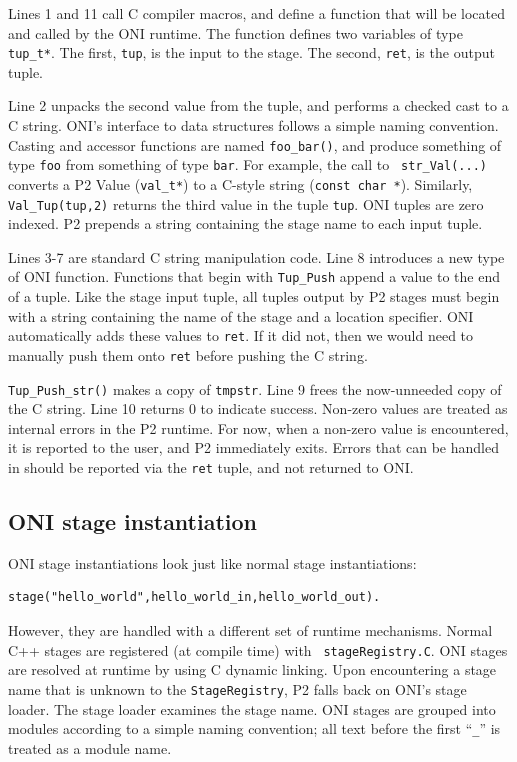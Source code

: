 \documentclass{article}
\begin{document}
Lines 1 and 11 call C compiler macros, and define a function that will
be located and called by the ONI runtime.  The function defines two
variables of type {\tt tup\_t*}.  The first, {\tt tup}, is the input to
the stage.  The second, {\tt ret}, is the output tuple.

Line 2 unpacks the second value from the tuple, and performs a checked
cast to a C string.  ONI's interface to \ol data structures
follows a simple naming convention.  Casting and accessor functions
are named {\tt foo\_bar()}, and produce something of type {\tt foo}
from something of type {\tt bar}.  For example, the call to {\tt
  str\_Val(...)} converts a P2 Value ({\tt val\_t*}) to a C-style
string ({\tt const char *}).  Similarly, {\tt Val\_Tup(tup,2)} returns
the third value in the tuple {\tt tup}.  ONI tuples are zero indexed.
P2 prepends a string containing the stage name to each input tuple.

Lines 3-7 are standard C string manipulation code.  Line 8 introduces
a new type of ONI function.  Functions that begin with {\tt Tup\_Push}
append a value to the end of a tuple.  Like the stage input tuple, all
tuples output by P2 stages must begin with a string containing the
name of the stage and a location specifier.  ONI automatically adds
these values to {\tt ret}.  If it did not, then we would need to
manually push them onto {\tt ret} before pushing the C string.

{\tt Tup\_Push\_str()} makes a copy of {\tt tmpstr}.  Line 9 frees the
now-unneeded copy of the C string.  Line 10 returns 0 to indicate
success.  Non-zero values are treated as internal errors in the P2
runtime.  For now, when a non-zero value is encountered, it is
reported to the user, and P2 immediately exits.  Errors that can be
handled in \ol should be reported via the {\tt ret} tuple, and not
returned to ONI.

\subsection{ONI stage instantiation}
ONI stage instantiations look just like normal stage instantiations:
\begin{lstlisting}
stage("hello_world",hello_world_in,hello_world_out).
\end{lstlisting}
However, they are handled with a different set of runtime mechanisms.
Normal C++ stages are registered (at compile time) with {\tt
  stageRegistry.C}.  ONI stages are resolved at runtime by using C
dynamic linking.  Upon encountering a stage name that is unknown to
the {\tt StageRegistry}, P2 falls back on ONI's stage loader.  The
stage loader examines the stage name.  ONI stages are grouped into
modules according to a simple naming convention; all text before the
first ``{\tt\_}'' is treated as a module name.
\end{document}

